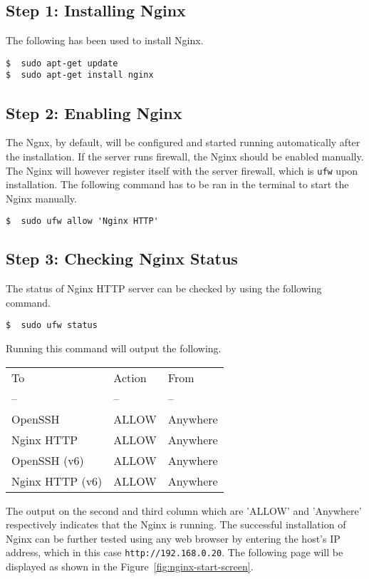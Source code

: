 \subsection{Step 1: Installing Nginx}
The following has been used to install Nginx.
\begin{lstlisting}
$  sudo apt-get update
$  sudo apt-get install nginx
\end{lstlisting}

\subsection{Step 2: Enabling Nginx}
The Ngnx, by default, will be configured and started running automatically after the installation. If the server runs firewall, the Nginx should be enabled manually. The Nginx will however register itself with the server firewall, which is \texttt{ufw} upon installation. The following command has to be ran in the terminal to start the Nginx manually.

\begin{lstlisting}
$  sudo ufw allow 'Nginx HTTP'
\end{lstlisting}

\subsection{Step 3: Checking Nginx Status}
The status of Nginx HTTP server can be checked by using the following command.

\begin{lstlisting}
$  sudo ufw status
\end{lstlisting}

Running this command will output the following.
\begin{table}[h]
\begin{tabular}{l l l}
To & Action & From \\
-- & -- & -- \\
OpenSSH & ALLOW & Anywhere \\
Nginx HTTP & ALLOW & Anywhere \\
OpenSSH  (v6) & ALLOW & Anywhere \\
Nginx HTTP (v6) & ALLOW & Anywhere \\
\end{tabular}
\end{table}

The output on the second and third column which are 'ALLOW' and 'Anywhere' respectively indicates that the Nginx is running. The successful installation of Nginx can be further tested using any web browser by entering the host's IP address, which in this case \texttt{http://192.168.0.20}. The following page will be displayed as shown in the Figure~\ref{fig:nginx-start-screen}.


